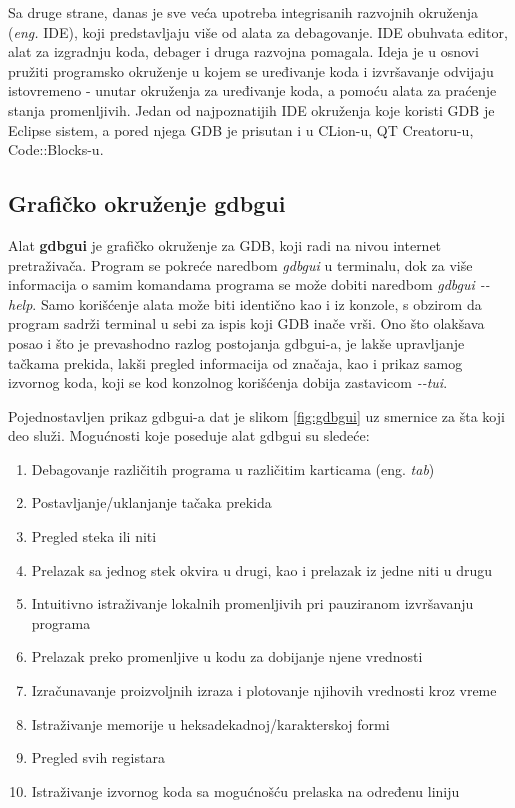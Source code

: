\documentclass[a4paper]{article}
\begin{document}
Sa druge strane, danas je sve veća upotreba integrisanih razvojnih okruženja (\textit{eng.} IDE),
koji predstavljaju više od alata za debagovanje. IDE obuhvata editor, alat za izgradnju koda, debager i druga 
razvojna pomagala. Ideja je u osnovi pružiti programsko okruženje u kojem se uređivanje koda i izvršavanje
odvijaju istovremeno - unutar okruženja za uređivanje koda, a pomoću alata za praćenje stanja promenljivih\cite{computerworld}.
Jedan od najpoznatijih IDE okruženja koje koristi GDB je Eclipse sistem,
a pored njega GDB je prisutan i u CLion-u, QT Creatoru-u, Code::Blocks-u\cite{sourceware}.

\subsection{Grafičko okruženje gdbgui}
\label{subsec:gdbgui}

Alat \textbf{gdbgui} je grafičko okruženje za GDB, koji radi na nivou internet pretraživača.
Program se pokreće naredbom \textit{gdbgui} u terminalu, dok za više informacija o samim komandama
programa se može dobiti naredbom \textit{gdbgui -\phantom{}-help}\cite{gdbgui}. Samo korišćenje alata može biti
identično kao i iz konzole, s obzirom da program sadrži terminal u sebi za ispis koji GDB inače vrši. Ono 
što olakšava posao i što je prevashodno razlog postojanja gdbgui-a, je lakše upravljanje tačkama prekida,
lakši pregled informacija od značaja, kao i prikaz samog izvornog koda, koji se kod konzolnog korišćenja 
dobija zastavicom \textit{-\phantom{}-tui}.

Pojednostavljen prikaz gdbgui-a dat je slikom \ref{fig:gdbgui} uz smernice za šta koji deo služi.
Mogućnosti koje poseduje alat gdbgui su sledeće\cite{n0where}: 
\begin{enumerate}
\item Debagovanje različitih programa u različitim karticama (eng. \textit{tab})
\item Postavljanje/uklanjanje tačaka prekida
\item Pregled steka ili niti
\item Prelazak sa jednog stek okvira u drugi, kao i prelazak iz jedne niti u drugu
\item Intuitivno istraživanje lokalnih promenljivih pri pauziranom izvršavanju programa
\item Prelazak preko promenljive u kodu za dobijanje njene vrednosti
\item Izračunavanje proizvoljnih izraza i plotovanje njihovih vrednosti kroz vreme
\item Istraživanje memorije u heksadekadnoj/karakterskoj formi
\item Pregled svih registara
\item Istraživanje izvornog koda sa mogućnošću prelaska na određenu liniju
\end{enumerate}
\end{document}
